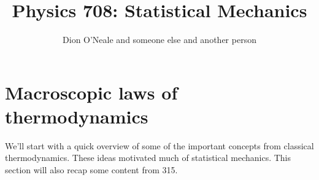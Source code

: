 \documentclass{article}
\title{Physics 708: Statistical Mechanics}
\author{Dion O'Neale 
	and someone else 
    and another person}
\begin{document}
\maketitle
\section{Macroscopic laws of thermodynamics}
We'll start with a quick overview of some of the important concepts from classical thermodynamics. These ideas motivated much of statistical mechanics. This section will also recap some content from 315.
\end{document}
